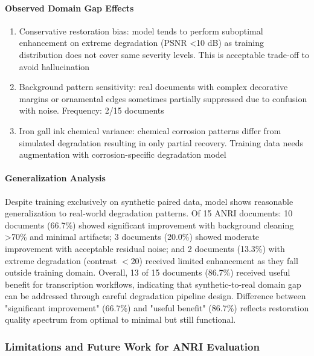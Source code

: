 \documentclass[journal]{IEEEtran}
\begin{document}
\paragraph{Observed Domain Gap Effects}
\begin{enumerate}
    \item Conservative restoration bias: model tends to perform suboptimal enhancement on extreme degradation (PSNR <10 dB) as training distribution does not cover same severity levels. This is acceptable trade-off to avoid hallucination
    
    \item Background pattern sensitivity: real documents with complex decorative margins or ornamental edges sometimes partially suppressed due to confusion with noise. Frequency: 2/15 documents
    
    \item Iron gall ink chemical variance: chemical corrosion patterns differ from simulated degradation resulting in only partial recovery. Training data needs augmentation with corrosion-specific degradation model
\end{enumerate}

\paragraph{Generalization Analysis}
Despite training exclusively on synthetic paired data, model shows reasonable generalization to real-world degradation patterns. Of 15 ANRI documents: 10 documents (66.7\%) showed significant improvement with background cleaning >70\% and minimal artifacts; 3 documents (20.0\%) showed moderate improvement with acceptable residual noise; and 2 documents (13.3\%) with extreme degradation (contrast $<$20) received limited enhancement as they fall outside training domain. Overall, 13 of 15 documents (86.7\%) received useful benefit for transcription workflows, indicating that synthetic-to-real domain gap can be addressed through careful degradation pipeline design. Difference between "significant improvement" (66.7\%) and "useful benefit" (86.7\%) reflects restoration quality spectrum from optimal to minimal but still functional.

\subsubsection{Limitations and Future Work for ANRI Evaluation}
\end{document}

